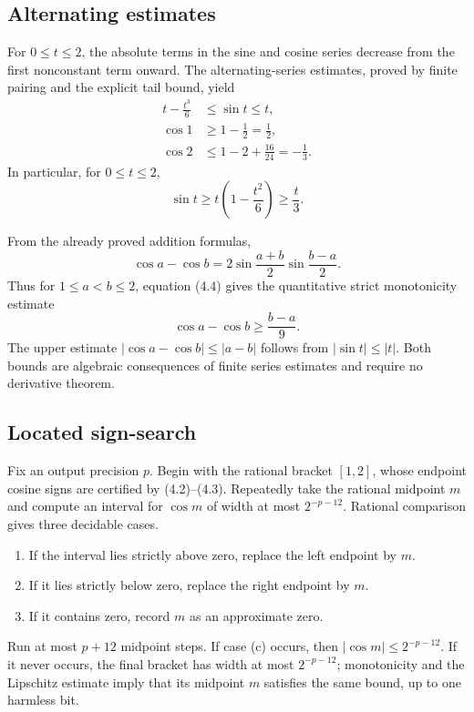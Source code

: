 \documentclass[11pt]{article}
\theoremstyle{definition}
\newcommand{\abs}[1]{\left|#1\right|}
\begin{document}
\subsection{Alternating estimates}

For \(0\le t\le2\), the absolute terms in the sine and cosine series decrease
from the first nonconstant term onward.  The alternating-series estimates,
proved by finite pairing and the explicit tail bound, yield
\begin{align}
 t-\frac{t^3}{6}&\le\sin t\le t,\tag{4.1}\\
 \cos1&\ge1-\frac12=\frac12,\tag{4.2}\\
 \cos2&\le1-2+\frac{16}{24}=-\frac13.\tag{4.3}
\end{align}
In particular, for \(0\le t\le2\),
\[
 \sin t\ge t\left(1-\frac{t^2}{6}\right)\ge\frac t3.
 \tag{4.4}
\]

From the already proved addition formulas,
\[
 \cos a-\cos b
 =2\sin\frac{a+b}{2}\sin\frac{b-a}{2}.
 \tag{4.5}
\]
Thus for \(1\le a<b\le2\), equation (4.4) gives the quantitative strict
monotonicity estimate
\[
 \cos a-\cos b\ge\frac{b-a}{9}.
 \tag{4.6}
\]
The upper estimate \(\abs{\cos a-\cos b}\le\abs{a-b}\) follows from
\(\abs{\sin t}\le\abs t\).  Both bounds are algebraic consequences of finite
series estimates and require no derivative theorem.

\subsection{Located sign-search}

Fix an output precision \(p\).  Begin with the rational bracket \([1,2]\), whose
endpoint cosine signs are certified by (4.2)--(4.3).  Repeatedly take the
rational midpoint \(m\) and compute an interval for \(\cos m\) of width at most
\(2^{-p-12}\).  Rational comparison gives three decidable cases.
\begin{enumerate}[label=\textup{(\alph*)}]
\item If the interval lies strictly above zero, replace the left endpoint by
\(m\).
\item If it lies strictly below zero, replace the right endpoint by \(m\).
\item If it contains zero, record \(m\) as an approximate zero.
\end{enumerate}
Run at most \(p+12\) midpoint steps.  If case (c) occurs, then
\(\abs{\cos m}\le2^{-p-12}\).  If it never occurs, the final bracket has width
at most \(2^{-p-12}\); monotonicity and the Lipschitz estimate imply that its
midpoint \(m\) satisfies the same bound, up to one harmless bit.
\end{document}
